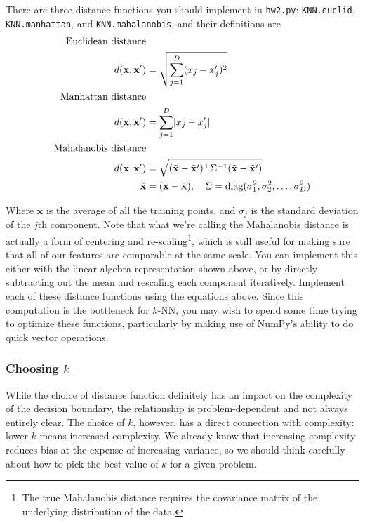 \documentclass{article}
\begin{document}
There are three distance functions you should implement in \texttt{hw2.py}: \texttt{KNN.euclid}, \texttt{KNN.manhattan}, and \texttt{KNN.mahalanobis}, and their definitions are
\begin{align}
	\text{Euclidean distance}&\notag\\
	d(\mathbf{x},\mathbf{x}^\prime) &= \sqrt{\sum_{j=1}^D (x_j-x^\prime_j)^2}\\
	\text{Manhattan distance}&\notag\\
	d(\mathbf{x},\mathbf{x}^\prime) &= \sum_{j=1}^D \lvert x_j-x^\prime_j \rvert\\
	\text{Mahalanobis distance}&\notag\\
	d(\mathbf{x},\mathbf{x}^\prime) &= \sqrt{ (\tilde{\mathbf{x}} - \tilde{\mathbf{x}}^\prime)^\top \Sigma^{-1} (\tilde{\mathbf{x}} - \tilde{\mathbf{x}}^\prime) }\\
	\tilde{\mathbf{x}} &= (\mathbf{x}-\bar{\mathbf{x}}), ~~~\Sigma = \text{diag}(\sigma_1^2,\sigma_2^2,\ldots,\sigma_D^2)\notag
\end{align}

Where \(\bar{\mathbf{x}}\) is the average of all the training points, and \(\sigma_j\) is the standard deviation of the \(j\)th component. Note that what we're calling the Mahalanobis distance is actually a form of centering and re-scaling\footnote{The true Mahalanobis distance requires the covariance matrix of the underlying distribution of the data.}, which is still useful for making sure that all of our features are comparable at the same scale. You can implement this either with the linear algebra representation shown above, or by directly subtracting out the mean and rescaling each component iteratively. Implement each of these distance functions using the equations above. Since this computation is the bottleneck for \(k\)-NN, you may wish to spend some time trying to optimize these functions, particularly by making use of NumPy's ability to do quick vector operations.

\subsubsection*{Choosing \(k\)}

While the choice of distance function definitely has an impact on the complexity of the decision boundary, the relationship is problem-dependent and not always entirely clear. The choice of \(k\), however, has a direct connection with complexity: lower \(k\) means increased complexity. We already know that increasing complexity reduces bias at the expense of increasing variance, so we should think carefully about how to pick the best value of \(k\) for a given problem.
\end{document}
